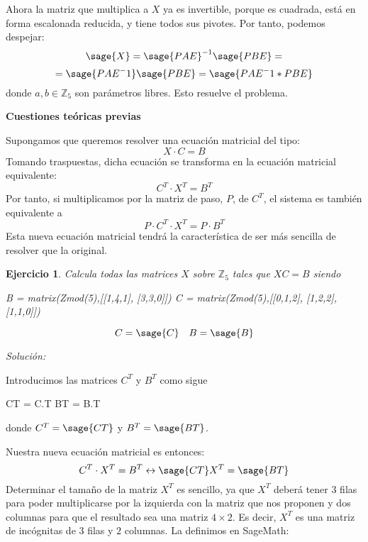 \documentclass{amsart}
\newtheorem{ejer}{Ejercicio}
\begin{document}
Ahora la matriz que multiplica a $X$ ya es invertible, porque es cuadrada, está en forma escalonada reducida, y tiene todos sus pivotes. Por tanto, podemos despejar:
$$ \sage{X} = {\sage{PAE}}^{-1} \sage{PBE} = $$
$$= \sage{PAE^-1}\sage{PBE}=\sage{PAE^-1 * PBE}$$
donde $a,b \in {\mathbb Z}_5$ son parámetros libres. Esto resuelve el problema.

\newpage

\begin{tcolorbox}[colback = orange!120!white]
{\bf Cuestiones teóricas previas}
\end{tcolorbox}

\begin{tcolorbox}[colback = orange!60!white]
Supongamos que queremos resolver una ecuación matricial del tipo:
$$ X\cdot C=B$$
Tomando traspuestas, dicha ecuación se transforma en la ecuación matricial equivalente:
$$C^T\cdot X^T= B^T$$
Por tanto, si multiplicamos por la matriz de paso, $P$,  de $C^T$, el sistema es también equivalente a
$$ P\cdot C^T\cdot X^T=P\cdot B^T$$
Esta nueva ecuación matricial tendrá la característica de ser más sencilla de resolver que la original. 
\end{tcolorbox}


\begin{ejer}
Calcula todas las matrices $X$ sobre ${\mathbb Z}_5$ tales que $XC = B$ siendo

\begin{sageblock}
B =  matrix(Zmod(5),[[1,4,1],
[3,3,0]])
C =  matrix(Zmod(5),[[0,1,2],
[1,2,2],
[1,1,0]])
\end{sageblock}

$$ C = \sage{C} \quad B = \sage{B} $$
\end{ejer}

{\it Solución:} 

Introducimos las matrices $C^T$ y $B^T$ como sigue
\begin{sageblock}
CT = C.T
BT = B.T
\end{sageblock}
donde $C^T=\sage{CT}$ y $B^T=\sage{BT}$.

Nuestra nueva ecuación matricial es entonces:
$$C^T \cdot X^T= B^T \leftrightarrow \sage{CT}X^T=\sage{BT}$$
Determinar el tamaño de la matriz $X^T$ es sencillo, ya que $X^T$ deberá tener $3$ filas para poder multiplicarse por la izquierda con la matriz que nos proponen
y dos columnas para que el resultado sea una matriz $4 \times 2$. Es decir, $X^T$ es una matriz de incógnitas de $3$ filas y $2$ columnas. La definimos en SageMath:
\end{document}
